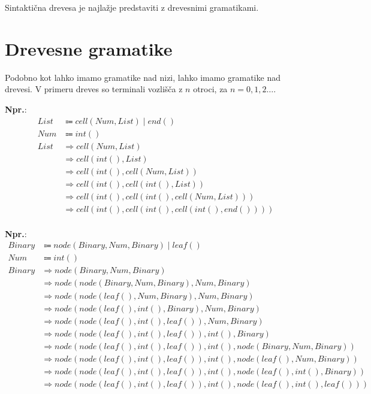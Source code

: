 \documentclass{report}
\newcommand{\Ex}{\textbf{Npr.}:\ }
\newcommand{\Union}{\mathrel{|}}
\newcommand{\Arrow}{\Coloneq}
\newlength{\arrow}
\newcommand{\Derive}{\Rightarrow}
\begin{document}
Sintaktična drevesa je najlažje predstaviti z drevesnimi gramatikami.

\section{Drevesne gramatike}

Podobno kot lahko imamo gramatike nad nizi, lahko imamo gramatike nad drevesi.
V primeru dreves so terminali vozlišča z $n$ otroci, za $n = 0, 1, 2 \dots$.

\Ex
\begin{equation*}
  \begin{aligned}
    List &\Arrow cell(Num, List) \Union end()\\
    Num &\Arrow int()\\[1em]
    List &\Derive cell(Num, List)\\
      &\Derive cell(int(), List)\\
      &\Derive cell(int(), cell(Num, List))\\
      &\Derive cell(int(), cell(int(), List))\\
      &\Derive cell(int(), cell(int(), cell(Num, List)))\\
      &\Derive cell(int(), cell(int(), cell(int(), end())))\\
  \end{aligned}
\end{equation*}

\Ex
\begin{equation*}
  \begin{aligned}
    Binary &\Arrow node(Binary, Num, Binary) \Union leaf()\\
    Num &\Arrow int()\\[1em]
    Binary &\Derive node(Binary, Num, Binary)\\
      &\Derive node(node(Binary, Num, Binary), Num, Binary)\\
      &\Derive node(node(leaf(), Num, Binary), Num, Binary)\\
      &\Derive node(node(leaf(), int(), Binary), Num, Binary)\\
      &\Derive node(node(leaf(), int(), leaf()), Num, Binary)\\
      &\Derive node(node(leaf(), int(), leaf()), int(), Binary)\\
      &\Derive node(node(leaf(), int(), leaf()), int(), node(Binary, Num, Binary))\\
      &\Derive node(node(leaf(), int(), leaf()), int(), node(leaf(), Num, Binary))\\
      &\Derive node(node(leaf(), int(), leaf()), int(), node(leaf(), int(), Binary))\\
      &\Derive node(node(leaf(), int(), leaf()), int(), node(leaf(), int(), leaf()))\\
  \end{aligned}
\end{equation*}
\end{document}
